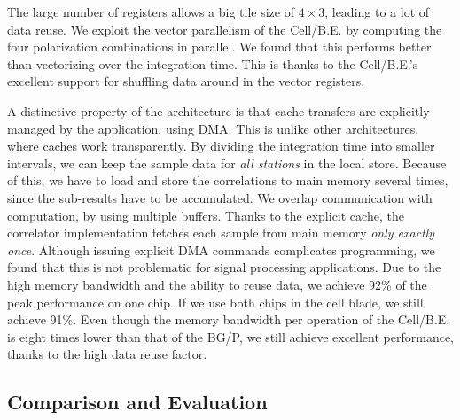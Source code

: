 \documentclass{article}
\begin{document}
The large number of registers allows a big tile size of 
$4\times3$, leading to a lot of data reuse.
We exploit the vector parallelism of the \mbox{Cell/B.E.} by computing the four
polarization combinations in parallel.  We found that this performs
better than vectorizing over the integration time.  This is thanks to the \mbox{Cell/B.E.}'s
excellent support for shuffling data around in the vector registers.

A distinctive property of the architecture is that cache transfers are
explicitly managed by the application, using DMA. This is unlike other 
architectures, where caches work transparently.
By dividing the
integration time into smaller intervals, we can keep the sample data
for \emph{all stations} in the local store.  
Because of this, we have to load and store the correlations to main
memory several times, since the sub-results have to
be accumulated.  
We overlap communication with computation, by using multiple buffers.
Thanks to the explicit cache,
the correlator implementation fetches each sample from main memory
\emph{only exactly once}. 
Although issuing explicit DMA commands complicates programming,
we found that this is not problematic for signal processing applications.
Due to the high
memory bandwidth and the ability to reuse data, we achieve 92\% of the peak
performance on one chip.  If we use both chips in the cell blade, we still achieve
91\%.  Even though the memory
bandwidth per operation of the \mbox{Cell/B.E.} is eight times lower than
that of the BG/P, we still achieve excellent performance, thanks to
the high data reuse factor.


\subsection{Comparison and Evaluation}
\label{sec:perf-compare}
\end{document}
